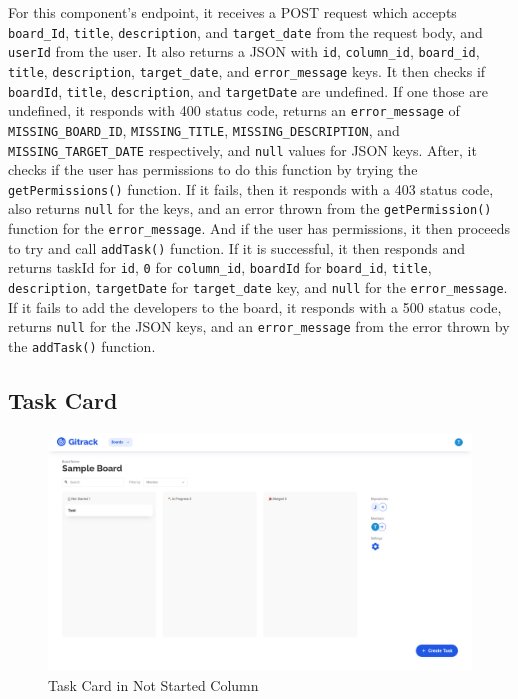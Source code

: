 \documentclass{article}
\def\code#1{\texttt{#1}}
\begin{document}
For this component’s endpoint, it receives a POST request which accepts
\code{board\_Id}, \code{title}, \code{description}, and \code{target\_date} from
the request body, and \code{userId} from the user. It also returns a JSON with
\code{id}, \code{column\_id}, \code{board\_id}, \code{title},
\code{description}, \code{target\_date}, and \code{error\_message} keys. It then
checks if \code{boardId}, \code{title}, \code{description}, and
\code{targetDate} are undefined. If one those are undefined, it responds with
400 status code, returns an \code{error\_message} of \code{MISSING\_BOARD\_ID},
\code{MISSING\_TITLE}, \code{MISSING\_DESCRIPTION}, and
\code{MISSING\_TARGET\_DATE} respectively, and \code{null} values for JSON keys.
After, it checks if the user has permissions to do this function by trying the
\code{getPermissions()} function. If it fails, then it responds with a 403
status code, also returns \code{null} for the keys, and an error thrown from the
\code{getPermission()} function for the \code{error\_message}. And if the user
has permissions, it then proceeds to try and call \code{addTask()} function. If
it is successful, it then responds and returns taskId for \code{id}, \code{0}
for \code{column\_id}, \code{boardId} for \code{board\_id}, \code{title},
\code{description}, \code{targetDate} for \code{target\_date} key, and
\code{null} for the \code{error\_message}. If it fails to add the developers to
the board, it responds with a 500 status code, returns \code{null} for the JSON keys,
and an \code{error\_message} from the error thrown by the \code{addTask()} function.

\subsection{Task Card}
\begin{figure}[H]
	\includegraphics[width=1\textwidth]{task-not-started}\par\vspace{0.5cm}
	\caption{Task Card in Not Started Column}
	\label{fig:task-not-started}
\end{figure}
\end{document}
